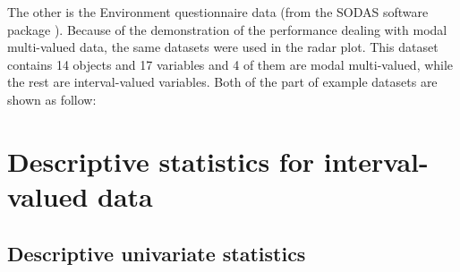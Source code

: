\documentclass[article]{jss}
\begin{document}
The other is the Environment questionnaire data (from the SODAS software package \cite{diday:2008}). Because of the demonstration of the performance dealing with modal multi-valued data, the same datasets were used in the radar plot. This dataset contains 14 objects and 17 variables and 4 of them are modal multi-valued, while the rest are interval-valued variables. Both of the part of example datasets are shown as follow:


\begin{table}[t!]
\caption{\label{tab:classic2sym} Summaries of the built-in interval-valued data.}
\end{table}%


\section{Descriptive statistics for interval-valued data}

\subsection{Descriptive univariate statistics}
\end{document}
